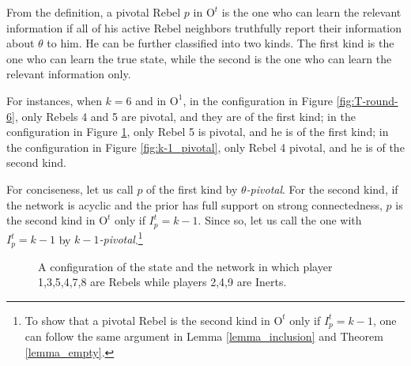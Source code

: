 \documentclass[12pt,letter]{article}
\newcommand{\Omicron}{\mathrm{O}}
\theoremstyle{definition}
\theoremstyle{remark}
\theoremstyle{claim}
\begin{document}
From the definition, a pivotal Rebel $p$ in $\Omicron^t$ is the one who can learn the relevant information if all of his active Rebel neighbors truthfully report their information about $\theta$ to him. He can be further classified into two kinds. The first kind is the one who can learn the true state, while the second is the one who can learn the relevant information only. 

For instances, when $k=6$ and in $\Omicron^1$, in the configuration in Figure \ref{fig:T-round-6}, only Rebels 4 and 5 are pivotal, and they are of the first kind; in the configuration in Figure \ref{fig:central_pivotal}, only Rebel 5 is pivotal, and he is of the first kind; in the configuration in Figure \ref{fig:k-1_pivotal}, only Rebel 4 pivotal, and he is of the second kind.

For conciseness, let us call $p$ of the first kind by \textit{$\theta$-pivotal}. For the second kind, if the network is acyclic and the prior has full support on strong connectedness, $p$ is the second kind in $\Omicron^{t}$ only if $I^{t}_p=k-1$. Since so, let us call the one with $I^t_p=k-1$ by \textit{$k-1$-pivotal}.\footnote{To show that a pivotal Rebel is the second kind in $\Omicron^{t}$ only if $I^{t}_p=k-1$, one can follow the same argument in Lemma \ref{lemma_inclusion} and Theorem \ref{lemma_empty}.}

\begin{figure}
\caption{A configuration of the state and the network in which player 1,3,5,4,7,8 are Rebels while players 2,4,9 are Inerts.}
\label{fig:central_pivotal}
\begin{center}
\end{center}
\end{figure}
\end{document}
